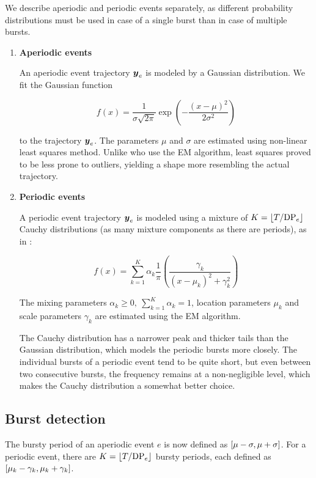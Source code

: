 We describe aperiodic and periodic events separately, as different probability distributions must be used in case of a single burst than in case of multiple bursts.

\begin{enumerate}

\item \textbf{Aperiodic events}

An aperiodic event trajectory $\vect{\traj}_{e}$ is modeled by a Gaussian distribution. We fit the Gaussian function

\begin{equation*}
	f(x) = \frac{1}{\sigma \sqrt{2 \pi}} \exp(-\frac{\left( x - \mu \right)^{2}}{2 \sigma^{2}})
\end{equation*}

to the trajectory $\vect{\traj}_{e}$. The parameters $\mu$ and $\sigma$ are estimated using non-linear least squares method. Unlike \cite{event-detection} who use the EM algorithm, least squares proved to be less prone to outliers, yielding a shape more resembling the actual trajectory.

\item \textbf{Periodic events}

A periodic event trajectory $\vect{\traj}_{e}$ is modeled using a mixture of $K = \lfloor T / \text{DP}_{e}\rfloor$ Cauchy distributions (as many mixture components as there are periods), as in \cite{health-events}:

\begin{equation*}
	f(x) = \sum_{k = 1}^{K}{\alpha_{k} \frac{1}{\pi} \left( \frac{\gamma_{k}}{\left( x - \mu_{k} \right)^{2} + \gamma_{k}^{2}} \right)}
\end{equation*}

The mixing parameters $\alpha_{k} \geq 0,\ \sum_{k = 1}^{K}{\alpha_{k}} = 1$, location parameters $\mu_{k}$ and scale parameters $\gamma_{k}$ are estimated using the EM algorithm.

The Cauchy distribution has a narrower peak and thicker tails than the Gaussian distribution, which models the periodic bursts more closely. The individual bursts of a periodic event tend to be quite short, but even between two consecutive bursts, the frequency remains at a non-negligible level, which makes the Cauchy distribution a somewhat better choice.

\end{enumerate}


\subsection{Burst detection}
The bursty period of an aperiodic event $e$ is now defined as $\interval{\mu - \sigma}{\mu + \sigma}$. For a periodic event, there are $K = \lfloor T / \text{DP}_{e}\rfloor$ bursty periods, each defined as $\interval{\mu_{k} - \gamma_{k}}{\mu_{k} + \gamma_{k}}$.

